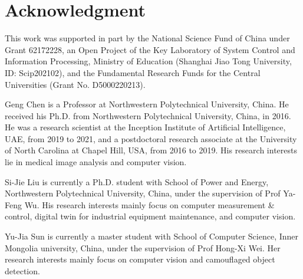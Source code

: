 \documentclass[lettersize,journal]{IEEEtran}
\begin{document}
\section*{Acknowledgment}
This work was supported in part by the National Science Fund of China under Grant 62172228, an Open Project of the Key Laboratory of System Control and Information Processing, Ministry of Education (Shanghai Jiao Tong University, ID: Scip202102), and the Fundamental Research Funds for the Central Universities (Grant No. D5000220213).


{
	
	
}


 
 \begin{IEEEbiography}{Geng Chen}
 	is a Professor at Northwestern Polytechnical University, China. He received his Ph.D. from Northwestern Polytechnical University, China, in 2016. He was a research scientist at the Inception Institute of Artificial Intelligence, UAE, from 2019 to 2021, and a postdoctoral research associate at the University of North Carolina at Chapel Hill, USA, from 2016 to 2019.
 	His research interests lie in medical image analysis and computer vision.
 \end{IEEEbiography}
 \begin{IEEEbiography}{Si-Jie Liu}
	is currently a Ph.D. student with School of Power and Energy, Northwestern Polytechnical University, China, 
	under the supervision of Prof Ya-Feng Wu. 
	His research interests mainly focus on computer measurement \& control, digital twin for industrial equipment maintenance, and computer vision.
\end{IEEEbiography}
 \begin{IEEEbiography}{Yu-Jia Sun}
	is currently a master student with School of Computer Science, Inner Mongolia university, China, under the supervision of Prof Hong-Xi Wei.
	Her research interests mainly focus on computer vision and camouflaged object detection.
\end{IEEEbiography}
\end{document}

